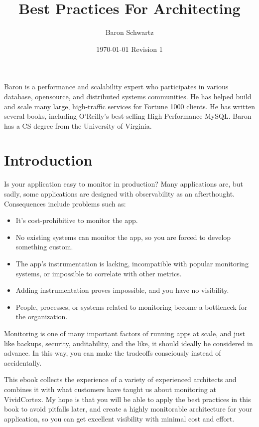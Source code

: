 \documentclass{vivid_layout}
\title{\fontsize{32pt}{15pt}\selectfont Best Practices For Architecting}{\fontsize{30.2pt}{15pt}\selectfont Highly Monitorable Applications}
\date{\color{white} \today{} \textbullet{} Revision 1}
\author{Baron Schwartz}{img/baron}
\begin{document}
\maketitle		%
\begin{bio}		%
Baron is a performance and scalability expert who participates in various
database, opensource, and distributed systems communities. He has helped build
and scale many large, high-traffic services for Fortune 1000 clients. He has
written several books, including O'Reilly's best-selling High Performance MySQL.
Baron has a CS degree from the University of Virginia.
\end{bio}
\tableofcontents	%

\section{Introduction}

Is your application easy to monitor in production? Many applications are, but
sadly, some applications are designed with observability as an afterthought.
Consequences include problems such as:

\begin{itemize}
\item It's cost-prohibitive to monitor the app.
\item No existing systems can monitor the app, so you are forced to develop
something custom.
\item The app's instrumentation is lacking, incompatible with popular monitoring
systems, or impossible to correlate with other metrics.
\item Adding instrumentation proves impossible, and you have no visibility.
\item People, processes, or systems related to monitoring become a bottleneck for the organization.
\end{itemize}

Monitoring is one of many important factors of running apps at scale, and just
like backups, security, auditability, and the like, it should ideally be
considered in advance. In this way, you can make the tradeoffs consciously instead
of accidentally.

This ebook collects the experience of a variety of experienced architects and
combines it with what customers have taught us about monitoring at
VividCortex. My hope is that you will be able to apply the best practices in
this book to avoid pitfalls later, and create a highly monitorable
architecture for your application, so you can get excellent visibility with
minimal cost and effort. 
\end{document}
